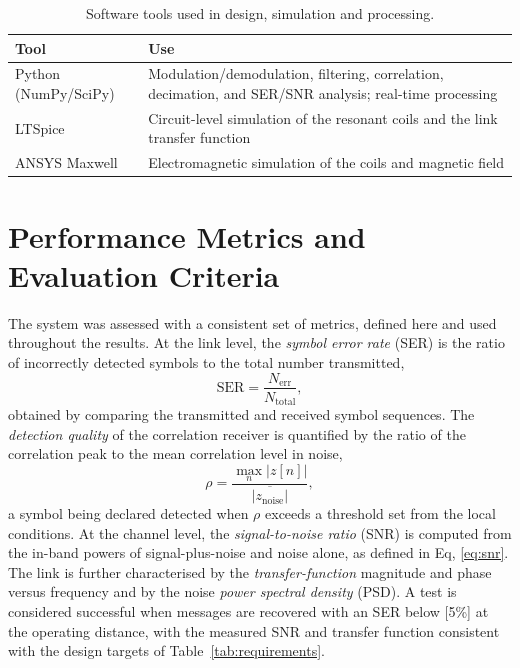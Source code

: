 \begin{table}[H]
  \centering
  \caption{Software tools used in design, simulation and processing.}
  \label{tab:software}
  \begin{tabular}{p{} p{}}
    \toprule
    \textbf{Tool} & \textbf{Use} \\
    \midrule
    Python (NumPy/SciPy) & Modulation/demodulation, filtering, correlation,
      decimation, and SER/SNR analysis; real-time processing \\
    LTSpice & Circuit-level simulation of the resonant coils and the link
      transfer function \\
    ANSYS Maxwell & Electromagnetic simulation of the coils and magnetic field \\
    \bottomrule
  \end{tabular}
\end{table}

\section{Performance Metrics and Evaluation Criteria}
\label{sec:metrics}

The system was assessed with a consistent set of metrics, defined here and used
throughout the results. At the link level, the \emph{symbol error rate} (SER) is
the ratio of incorrectly detected symbols to the total number transmitted,
\begin{equation}
    \mathrm{SER} = \frac{N_{\mathrm{err}}}{N_{\mathrm{total}}},
    \label{eq:ser_def}
\end{equation}
obtained by comparing the transmitted and received symbol sequences. The
\emph{detection quality} of the correlation receiver is quantified by the ratio of
the correlation peak to the mean correlation level in noise,
\begin{equation}
    \rho = \frac{\max_n |z[n]|}{\overline{|z_{\mathrm{noise}}|}},
    \label{eq:detection_ratio}
\end{equation}
a symbol being declared detected when $\rho$ exceeds a threshold set from the
local conditions. At the channel level, the \emph{signal-to-noise ratio} (SNR) is
computed from the in-band powers of signal-plus-noise and noise alone, as defined in Eq, \ref{eq:snr}. The link is further characterised by the \emph{transfer-function} magnitude and phase versus frequency and by the noise \emph{power spectral density} (PSD). A
test is considered successful when messages are recovered with an SER below
[5\%] at the operating distance, with the measured SNR and transfer
function consistent with the design targets of
Table~\ref{tab:requirements}.


